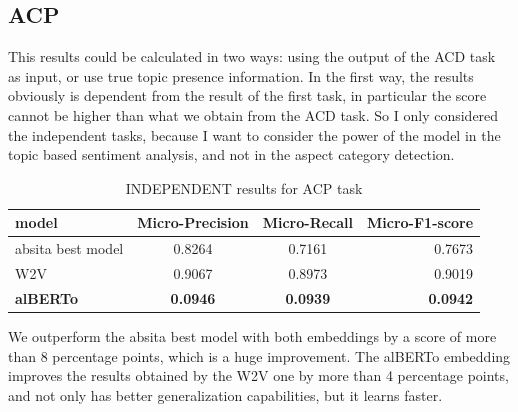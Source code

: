\documentclass{article}
\begin{document}
            \subsection{ACP}\label{subsec:s6}
            This results could be calculated in two ways: using the output of the ACD task as input, or use true topic presence information.
                In the first way, the results obviously is dependent from the result of the first task, in particular the score cannot be higher than what we obtain from the ACD task.
                So I only considered the independent tasks, because I want to consider the power of the model in the topic based sentiment analysis, and not in the aspect category detection.
                \begin{table}[h!]
                    \begin{center}
                        \caption{INDEPENDENT results for ACP task}
                        \label{tab:table4}
                        \begin{tabular}{l|c|c|r}
                            \textbf{model} & \textbf{Micro-Precision} & \textbf{Micro-Recall} & \textbf{Micro-F1-score}\\
                            \hline
                                absita best model & 0.8264 & 0.7161 & 0.7673\\
                                W2V & 0.9067 & 0.8973 & 0.9019\\
                                \textbf{alBERTo} & \textbf{0.0946} & \textbf{0.0939} & \textbf{0.0942}\\
                        \end{tabular}
                    \end{center}
                \end{table}
            We outperform the absita best model with both embeddings by a score of more than 8 percentage points, which is a huge improvement.
            The alBERTo embedding improves the results obtained by the W2V one by more than 4 percentage points, and not only has better generalization capabilities, but it learns faster.
\end{document}
